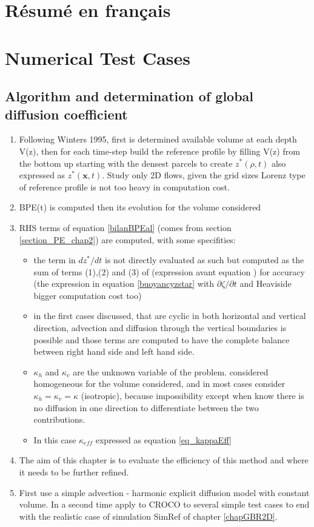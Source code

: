 
\section{Résumé en français}

\section{Numerical Test Cases}

\subsection{Algorithm and determination of global diffusion coefficient}
\begin{enumerate}
\setlength\itemsep{0pt}
\item Following Winters 1995, first is determined available volume at each depth V(z), then for each time-step build the reference profile by filling V(z) from the bottom up starting with the densest parcels to create $z^*(\rho,t)$ also expressed as $z^*(\mathbf{x},t)$. Study only 2D flows, given the grid sizes Lorenz type of reference profile is not too heavy in computation cost.
\item BPE(t) is computed then its evolution for the volume considered
\item RHS terms of equation \ref{bilanBPEal} (comes from section \ref{section_PE_chap2}) are computed, with some specifities:
\begin{itemize}
\setlength\itemsep{0pt}
\item the term in $dz^*/dt$ is not directly evaluated as such but computed as the sum of terms (1),(2) and (3) of (expression avant equation \label{eq_evolBPE}) for accuracy (the expression in equation \ref{buoyancyzstar} with $\partial \zeta / \partial t$ and Heaviside bigger computation cost too)
\item in the first cases discussed, that are cyclic in both horizontal and vertical direction, advection and diffusion through the vertical boundaries is possible and those terms are computed to have the complete balance between right hand side and left hand side.
\item $\kappa_h$ and $\kappa_v$ are the unknown variable of the problem. considered homogeneous for the volume considered, and in most cases consider $\kappa_h=\kappa_v=\kappa$ (isotropic), because impossibility except when know there is no diffusion in one direction to differentiate between the two contributions.
\item In this case $\kappa_{eff}$ expressed as equation \ref{eq_kappaEff}
\end{itemize}
\item The aim of this chapter is to evaluate the efficiency of this method and where it needs to be further refined.
\item First use a simple advection - harmonic explicit diffusion model with constant volume. In a second time apply to CROCO to several simple test cases to end with the realistic case of simulation SimRef of chapter \ref{chapGBR2D}.
\end{enumerate}


